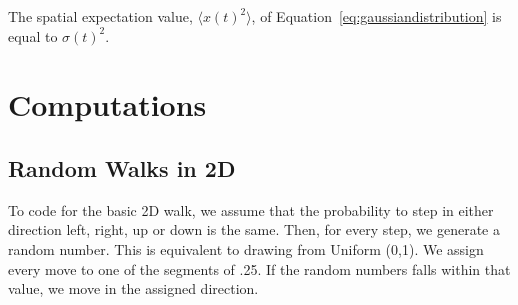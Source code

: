 \documentclass[10pt]{article}
\begin{document}
The spatial expectation value, $\langle x(t)^2\rangle$, of Equation~\ref{eq:gaussiandistribution} is equal to $\sigma(t)^2$.

\section{Computations}
\label{sec:computations}

\subsection{Random Walks in 2D}
\label{sec:computationsRandomWalk}
To code for the basic 2D walk, we assume that the probability to step in either direction left, right, up or down is the same. Then, for every step, we generate a random number. This is equivalent to drawing from Uniform (0,1). We assign every move to one of the segments of .25. If the random numbers falls within that value, we move in the assigned direction. 
\end{document}
